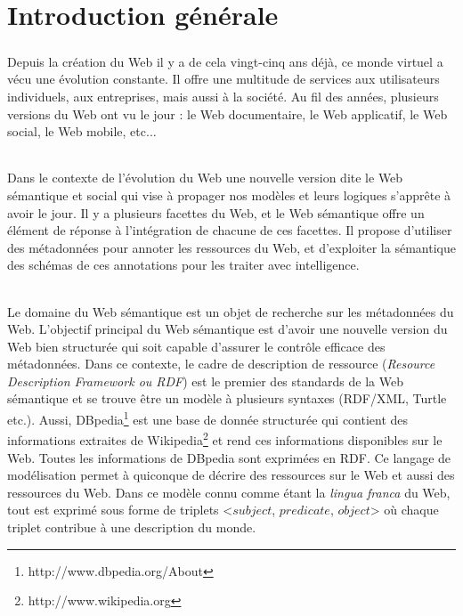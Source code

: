 \chapter*{Introduction générale}
\paragraph{}
Depuis la création du Web il y a de cela vingt-cinq ans déjà, ce monde virtuel a vécu une évolution constante. Il offre une multitude de services aux utilisateurs individuels, aux entreprises, mais aussi à la société. Au fil des années, plusieurs versions du Web ont vu le jour : le Web documentaire, le Web applicatif, le Web social, le Web mobile, etc...
\subparagraph{}
Dans le contexte de l’évolution du Web une nouvelle version dite le Web sémantique et social qui vise à propager nos modèles et leurs logiques s’apprête à avoir le jour. Il y a plusieurs facettes du Web, et le Web sémantique offre un élément de réponse à l’intégration de chacune de ces facettes. Il propose d’utiliser des métadonnées pour annoter les ressources du Web, et d’exploiter la sémantique des schémas de ces annotations pour les traiter avec intelligence.
\subparagraph{}
Le domaine du Web sémantique est un objet de recherche sur les métadonnées du Web. L'objectif principal du Web sémantique est d’avoir une nouvelle version du Web bien structurée qui soit capable d’assurer le contrôle efficace des métadonnées. Dans ce contexte, le cadre de description de ressource ({\itshape Resource Description Framework ou RDF}) est le premier des standards de la Web sémantique et se trouve être un modèle à plusieurs syntaxes (RDF/XML, Turtle etc.). Aussi, DBpedia\footnote{http://www.dbpedia.org/About} est une base de donnée structurée qui contient des informations extraites de Wikipedia\footnote{http://www.wikipedia.org} et rend ces informations disponibles sur le Web. Toutes les informations de DBpedia sont exprimées en RDF. Ce langage de modélisation permet à quiconque de décrire des ressources sur le Web et aussi des ressources du Web. Dans ce modèle connu comme étant la {\itshape lingua franca} du Web, tout est exprimé sous forme de triplets <$subject$, $predicate$, $object$> où chaque triplet contribue à une description du monde.
